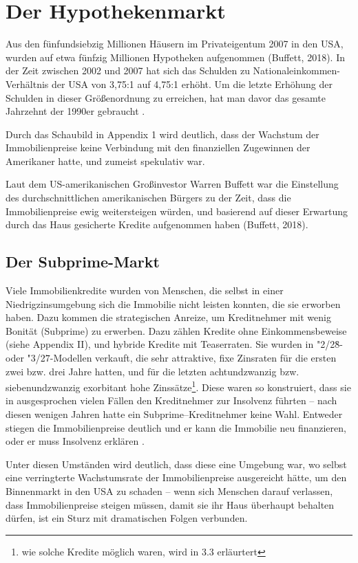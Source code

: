 \documentclass[a4paper,11pt]{report}
\begin{document}
\section{Der Hypothekenmarkt}
Aus den f\"unfundsiebzig Millionen H\"ausern im
Privateigentum 2007 in den USA, wurden auf etwa f\"unfzig Millionen
Hypotheken aufgenommen (Buffett, 2018).
In der Zeit zwischen 2002 und 2007 hat sich das
Schulden zu Nationaleinkommen-Verhältnis
der USA von 3,75:1 auf 4,75:1 erhöht.
Um die letzte Erhöhung der Schulden in
dieser Größenordnung zu erreichen, hat man davor
das gesamte Jahrzehnt der 1990er
gebraucht \parencite[S. 195f.]{acharyar}.

Durch das Schaubild in Appendix 1 wird deutlich,
dass der Wachstum der Immobilienpreise keine Verbindung
mit den finanziellen Zugewinnen der Amerikaner hatte,
und zumeist spekulativ war. 

Laut dem US-amerikanischen
Großinvestor Warren Buffett war die Einstellung
des durchschnittlichen amerikanischen
B\"urgers zu der Zeit,
dass die Immobilienpreise ewig weitersteigen w\"urden,
und basierend auf dieser Erwartung durch das Haus
gesicherte Kredite aufgenommen haben (Buffett, 2018).

\subsection{Der Subprime-Markt}
Viele Immobilienkredite wurden von Menschen, die selbst
in einer Niedrigzinsumgebung sich die Immobilie nicht leisten
konnten, die sie erworben haben.
Dazu kommen die strategischen Anreize, um Kreditnehmer
mit wenig Bonit\"at (Subprime) zu erwerben. Dazu z\"ahlen
Kredite ohne Einkommensbeweise (siehe Appendix II), 
und hybride Kredite mit Teaserraten. Sie wurden in "2/28\"\-- oder
"3/27\"\--Modellen verkauft, die sehr attraktive, fixe Zinsraten
f\"ur die ersten zwei bzw. drei Jahre hatten, und
f\"ur die letzten achtundzwanzig bzw.
siebenundzwanzig exorbitant hohe Zinss\"atze\footnote{
  wie solche Kredite m\"oglich waren, wird in 3.3 erl\"aurtert}.
Diese waren so konstruiert, dass sie in ausgesprochen vielen
F\"allen den Kreditnehmer zur Insolvenz f\"uhrten --
nach diesen wenigen Jahren hatte ein Subprime--Kreditnehmer
keine Wahl. Entweder stiegen die Immobilienpreise deutlich
und er kann die Immobilie neu finanzieren, oder er muss
Insolvenz erkl\"aren \parencite[S. 208]{acharyar}.

Unter diesen Umst\"anden wird deutlich, dass diese eine
Umgebung war, wo selbst eine verringterte Wachstumsrate
der Immobilienpreise ausgereicht h\"atte,
um den Binnenmarkt in den USA zu schaden -- wenn sich
Menschen darauf verlassen, dass Immobilienpreise
steigen m\"ussen, damit sie ihr Haus \"uberhaupt behalten
d\"urfen, ist ein Sturz mit dramatischen Folgen verbunden.
\end{document}
